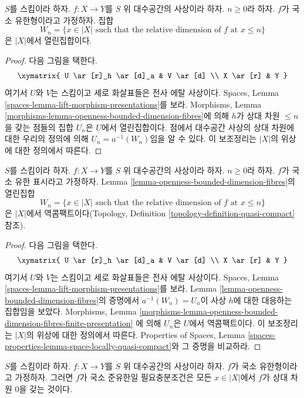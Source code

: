 \begin{lemma}
\label{lemma-openness-bounded-dimension-fibres}
$S$를 스킴이라 하자.
$f : X \to Y$를 $S$ 위 대수공간의 사상이라 하자.
$n \geq 0$라 하자. $f$가 국소 유한형이라고 가정하자. 집합
$$
W_n = \{x \in |X|
\text{ such that the relative dimension of }f\text{ at } x \leq n\}
$$
은 $|X|$에서 열린집합이다.
\end{lemma}

\begin{proof}
다음 그림을 택한다.
$$
\xymatrix{
U \ar[r]_h \ar[d]_a & V \ar[d] \\
X \ar[r] & Y
}
$$
여기서 $U$와 $V$는 스킴이고 세로 화살표들은 전사 에탈 사상이다.
Spaces, Lemma \ref{spaces-lemma-lift-morphism-presentations}를 보라.
Morphisms, Lemma
\ref{morphisms-lemma-openness-bounded-dimension-fibres}에 의해
$h$가 상대 차원 $\leq n$을 갖는 점들의 집합 $U_n$은 $U$에서
열린집합이다. 점에서 대수공간 사상의 상대 차원에 대한 우리의
정의에 의해 $U_n = a^{-1}(W_n)$임을 알 수 있다.
이 보조정리는 $|X|$의 위상에 대한 정의에서 따른다.
\end{proof}

\begin{lemma}
\label{lemma-openness-bounded-dimension-fibres-finite-presentation}
$S$를 스킴이라 하자.
$f : X \to Y$를 $S$ 위 대수공간의 사상이라 하자.
$n \geq 0$라 하자. $f$가 국소 유한 표시라고 가정하자.
Lemma \ref{lemma-openness-bounded-dimension-fibres}의 열린집합
$$
W_n = \{x \in |X|
\text{ such that the relative dimension of }f\text{ at } x \leq n\}
$$
은 $|X|$에서 역콤팩트이다(Topology, Definition
\ref{topology-definition-quasi-compact} 참조).
\end{lemma}

\begin{proof}
다음 그림을 택한다.
$$
\xymatrix{
U \ar[r]_h \ar[d]_a & V \ar[d] \\
X \ar[r] & Y
}
$$
여기서 $U$와 $V$는 스킴이고 세로 화살표들은 전사 에탈 사상이다.
Spaces, Lemma \ref{spaces-lemma-lift-morphism-presentations}를 보라.
Lemma \ref{lemma-openness-bounded-dimension-fibres}의 증명에서
$a^{-1}(W_n) = U_n$이 사상 $h$에 대한 대응하는 집합임을 보았다.
Morphisms, Lemma
\ref{morphisms-lemma-openness-bounded-dimension-fibres-finite-presentation}
에 의해 $U_n$은 $U$에서 역콤팩트이다.
이 보조정리는 $|X|$의 위상에 대한 정의에서 따른다. Properties of
Spaces, Lemma \ref{spaces-properties-lemma-space-locally-quasi-compact}와
그 증명을 비교하라.
\end{proof}

\begin{lemma}
\label{lemma-locally-quasi-finite-rel-dimension-0}
$S$를 스킴이라 하자.
$f : X \to Y$를 $S$ 위 대수공간의 사상이라 하자.
$f$가 국소 유한형이라고 가정하자. 그러면 $f$가 국소 준유한일
필요충분조건은 모든 $x \in |X|$에서 $f$가 상대 차원 $0$을 갖는 것이다.
\end{lemma}

